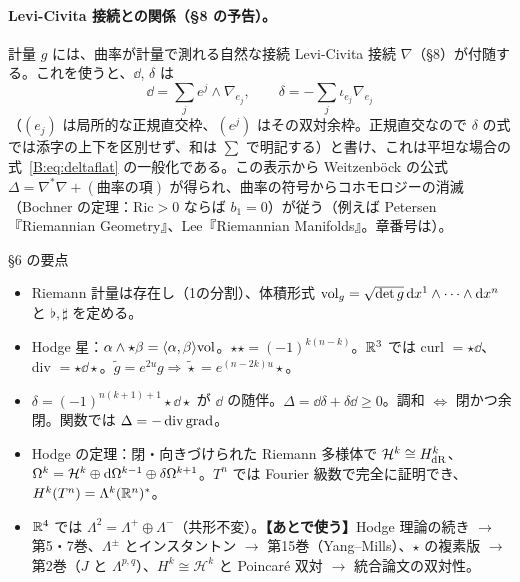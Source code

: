 \paragraph{Levi-Civita 接続との関係（§8 の予告）。}計量 $g$ には、曲率が計量で測れる自然な接続 Levi-Civita 接続 $\nabla$（§8）が付随する。これを使うと、$\dd$, $\delta$ は
\[
\dd=\sum_j e^j\wedge\nabla_{e_j},\qquad\delta=-\sum_j\iota_{e_j}\nabla_{e_j}
\]
（$(e_j)$ は局所的な正規直交枠、$(e^j)$ はその双対余枠。正規直交なので $\delta$ の式では添字の上下を区別せず、和は $\sum$ で明記する）と書け、これは平坦な場合の式~\eqref{B:eq:deltaflat} の一般化である。この表示から Weitzenböck の公式 $\Delta=\nabla^*\nabla+(\text{曲率の項})$ が得られ、曲率の符号からコホモロジーの消滅（Bochner の定理：$\mathrm{Ric}>0$ ならば $b_1=0$）が従う\tC（例えば Petersen『\mbox{Riemannian} Geometry』、Lee『Riemannian Manifolds』。章番号は\tQ）。

\begin{keybox}{§6 の要点}
\begin{itemize}
\item Riemann 計量は存在し（1の分割）、体積形式 $\mathrm{vol}_g=\sqrt{\det g}\,\mathrm{d} x^1\wedge\cdots\wedge\mathrm{d} x^n$ と $\flat,\sharp$ を定める。
\item Hodge 星：$\alpha\wedge\star\beta=\langle\alpha,\beta\rangle\mathrm{vol}$。$\star\star=(-1)^{k(n-k)}$。$\mathbb R^3$ では curl $=\star\dd$、div $=\star\dd\star$。$\tilde g=e^{2u}g\Rightarrow\tilde\star=e^{(n-2k)u}\star$。
\item $\delta=(-1)^{n(k+1)+1}\star\dd\star$ が $\dd$ の随伴。$\Delta=\dd\delta+\delta\dd\ge0$。調和 $\iff$ 閉かつ余閉。関数では $\Delta=-\operatorname{div}\operatorname{grad}$。
\item Hodge の定理：閉・向きづけられた Riemann 多様体で $\mathcal H^k\cong H^k_{\rm dR}$、$\Omega^k=\mathcal H^k\oplus\mathrm{d}\Omega^{k-1}\oplus\delta\Omega^{k+1}$。$T^n$ では Fourier 級数で完全に証明でき、$H^k(T^n)=\Lambda^k(\mathbb R^n)^*$。
\item $\mathbb R^4$ では $\Lambda^2=\Lambda^+\oplus\Lambda^-$（共形不変）。\textbf{【あとで使う】}Hodge 理論の続き $\to$ 第5・7巻、$\Lambda^\pm$ とインスタントン $\to$ 第15巻（Yang--Mills）、$\star$ の複素版 $\to$ 第2巻（$J$ と $\Lambda^{p,q}$）、$H^k\cong\mathcal H^k$ と Poincaré 双対 $\to$ 統合論文の双対性。
\end{itemize}
\end{keybox}

